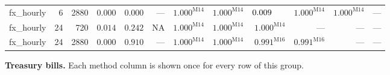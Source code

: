 \begin{longtable}{@{}lrrrrrrrrrrr@{}}
fx\_hourly & 6 & 2880 & $0.000$ & $0.000$ & --- & $\mathbf{1.000}^{\mathrm{M14}}$ & $\mathbf{1.000}^{\mathrm{M14}}$ & $0.009\hphantom{^{\mathrm{M00}}}$ & $\mathbf{1.000}^{\mathrm{M14}}$ & $\mathbf{1.000}^{\mathrm{M14}}$ & --- \\
fx\_hourly & 24 & 720 & $0.014$ & $\mathbf{0.242}$ & \textsc{NA} & $\mathbf{1.000}^{\mathrm{M14}}$ & $\mathbf{1.000}^{\mathrm{M14}}$ & $\mathbf{1.000}^{\mathrm{M14}}$ & --- & --- & --- \\
fx\_hourly & 24 & 2880 & $0.000$ & $\mathbf{0.910}$ & --- & $\mathbf{1.000}^{\mathrm{M14}}$ & $\mathbf{1.000}^{\mathrm{M14}}$ & $\mathbf{0.991}^{\mathrm{M16}}$ & $\mathbf{0.991}^{\mathrm{M16}}$ & --- & --- \\
\end{longtable}

\clearpage
\noindent\textbf{Treasury bills.} Each method column is shown once for every row of this group.\par
